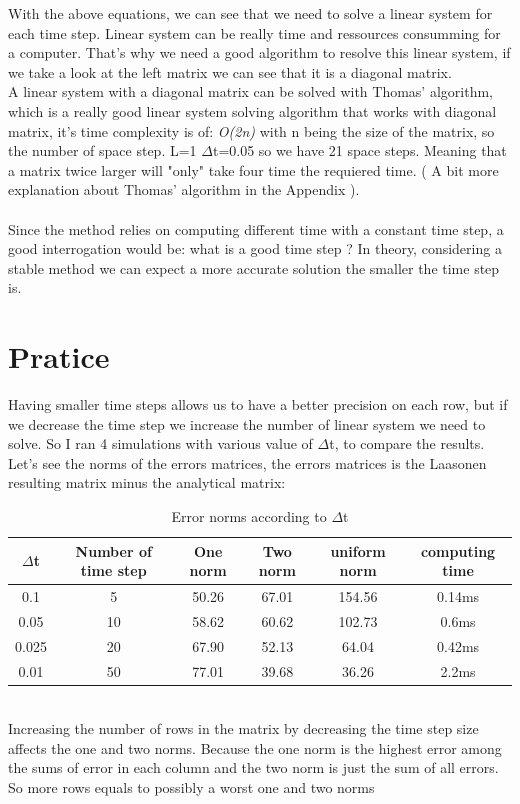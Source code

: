 \documentclass[12pt, a4paper]{report}
\begin{document}
With the above equations, we can see that we need to solve a linear system for each time step. Linear system can be really time and ressources consumming for a computer. That's why we need a good algorithm to resolve this linear system, if we take a look at the left matrix we can see that it is a diagonal matrix.\\
A linear system with a diagonal matrix can be solved with Thomas' algorithm, which is a really good linear system solving algorithm that works with diagonal matrix, it's time complexity is of:  \textit{O(2n)} with n being the size of the matrix, so the number of space step. L=1 $\Delta$t=0.05 so we have 21 space steps. Meaning that a matrix twice larger will "only" take four time the requiered time. ( A bit more explanation about Thomas' algorithm in the Appendix ).
\paragraph{}
Since the method relies on computing different time with a constant time step, a good interrogation would be: what is a good time step ? In theory, considering a stable method we can expect a more accurate solution the smaller the time step is.

\section{Pratice} 
Having smaller time steps allows us to have a better precision on each row, but if we decrease the time step we increase the number of linear system we need to solve. So I ran 4 simulations with various value of $\Delta$t, to compare the results. Let's see the norms of the errors matrices, the errors matrices is the Laasonen resulting matrix minus the analytical matrix:
\begin{table}[ht]
\centering
\begin{tabular}{c c c c c c}
\toprule
$\Delta$t&Number of time step&One norm&Two norm&uniform norm&computing time\\
\midrule
0.1 &5&50.26&67.01&154.56&0.14ms\\
0.05 &10&58.62&60.62&102.73&0.6ms\\
0.025 &20&67.90&52.13&64.04&0.42ms\\
0.01 &50&77.01&39.68&36.26&2.2ms\\
\end{tabular}
\caption{Error norms according to $\Delta$t}
\end{table} \\
Increasing the number of rows in the matrix by decreasing the time step size affects the one and two norms. Because the one norm is the highest error among the sums of error in each column and the two norm is just the sum of all errors. So more rows equals to possibly a worst one and two norms\\
\end{document}
